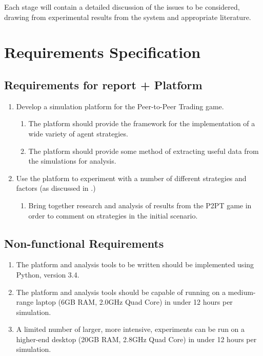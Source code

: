 \documentclass{article}
\begin{document}
Each stage will contain a detailed discussion of the issues to be considered, drawing from experimental results from the system and appropriate literature.

\section{Requirements Specification}
\label{sec:requirements-spec}
\subsection{Requirements for report + Platform}
\begin{enumerate}
	\item Develop a simulation platform for the Peer-to-Peer Trading game.
	\begin{enumerate}
		\item The platform should provide the framework for the implementation of a wide variety of agent strategies.
		\item The platform should provide some method of extracting useful data from the simulations for analysis.
	\end{enumerate}
	\item Use the platform to experiment with a number of different strategies and factors (as discussed in .)
	\begin{enumerate}
		\item Bring together research and analysis of results from the P2PT game in order to comment on strategies in the initial scenario.
	\end{enumerate}
\end{enumerate}

\subsection{Non-functional Requirements}
\label{sec:non-functional}
\begin{enumerate}
	\item The platform and analysis tools to be written should be implemented using Python, version 3.4.
	\item The platform and analysis tools should be capable of running on a medium-range laptop (6GB RAM, 2.0GHz Quad Core) in under 12 hours per simulation.
	\item A limited number of larger, more intensive, experiments can be run on a higher-end desktop (20GB RAM, 2.8GHz Quad Core) in under 12 hours per simulation.
\end{enumerate}
\end{document}
